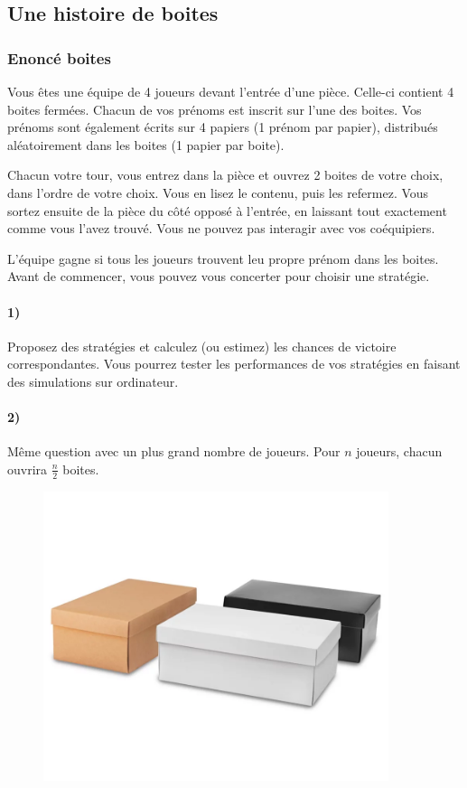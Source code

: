 \documentclass[a4paper,10pt,oneside]{article}
\begin{document}
\newpage
\subsection{Une histoire de boites}

\subsubsection{Enoncé boites}

Vous êtes une équipe de 4 joueurs devant l'entrée d'une pièce. 
Celle-ci contient 4 boites fermées.
Chacun de vos prénoms est inscrit sur l'une des boites.
Vos prénoms sont également écrits sur 4 papiers (1 prénom par papier), distribués aléatoirement dans les boites (1 papier par boite).

Chacun votre tour, vous entrez dans la pièce et ouvrez 2 boites de votre choix, dans l'ordre de votre choix. 
Vous en lisez le contenu, puis les refermez.
Vous sortez ensuite de la pièce du côté opposé à l'entrée, en laissant tout exactement comme vous l'avez trouvé.
Vous ne pouvez pas interagir avec vos coéquipiers.

L'équipe gagne si tous les joueurs trouvent leu propre prénom dans les boites. Avant de commencer, vous pouvez vous concerter pour choisir une stratégie.

\paragraph*{1)}
Proposez des stratégies et calculez (ou estimez) les chances de victoire correspondantes.
Vous pourrez tester les performances de vos stratégies en faisant des simulations sur ordinateur.

\paragraph*{2)} 
Même question avec un plus grand nombre de joueurs. Pour $n$ joueurs, chacun ouvrira $\frac{n}{2}$ boites.

\vspace{3cm}
\begin{figure}[!ht]
  \centering
  \includegraphics[width=0.9\textwidth]{figures/boites.png}
\end{figure}
\end{document}
